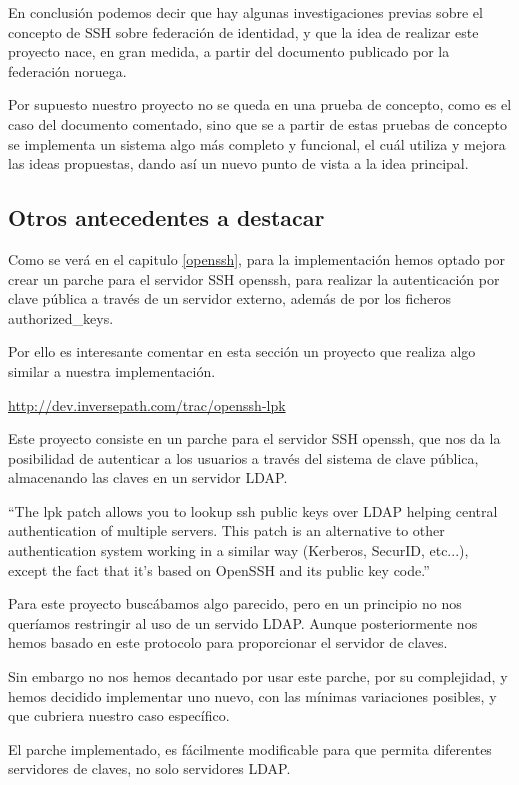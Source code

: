     En conclusión podemos decir que hay algunas investigaciones
    previas sobre el concepto de SSH sobre federación de identidad, y
    que la idea de realizar este proyecto nace, en gran medida, a
    partir del documento publicado por la federación noruega.
    
    Por supuesto nuestro proyecto no se queda en una prueba de
    concepto, como es el caso del documento comentado, sino que se a
    partir de estas pruebas de concepto se implementa un sistema algo
    más completo y funcional, el cuál utiliza y mejora las ideas
    propuestas, dando así un nuevo punto de vista a la idea principal.

    
    \subsection{Otros antecedentes a destacar}
    
        Como se verá en el capitulo \ref{openssh}, para la
        implementación hemos optado por crear un parche para el
        servidor SSH openssh, para realizar la autenticación por clave
        pública a través de un servidor externo, además de por los
        ficheros authorized\_keys.

        Por ello es interesante comentar en esta sección un proyecto
        que realiza algo similar a nuestra implementación.

        \href{http://dev.inversepath.com/trac/openssh-lpk}{http://dev.inversepath.com/trac/openssh-lpk}

        Este proyecto consiste en un parche para el servidor SSH
        openssh, que nos da la posibilidad de autenticar a los
        usuarios a través del sistema de clave pública, almacenando
        las claves en un servidor LDAP.

        ``The lpk patch allows you to lookup ssh public keys over LDAP
        helping central authentication of multiple servers. This patch
        is an alternative to other authentication system working in a
        similar way (Kerberos, SecurID, etc...), except the fact that
        it's based on OpenSSH and its public key code.''
        
        Para este proyecto buscábamos algo parecido, pero en un
        principio no nos queríamos restringir al uso de un servido
        LDAP. Aunque posteriormente nos hemos basado en este protocolo
        para proporcionar el servidor de claves.

        Sin embargo no nos hemos decantado por usar este parche, por
        su complejidad, y hemos decidido implementar uno nuevo, con
        las mínimas variaciones posibles, y que cubriera nuestro caso
        específico.

        El parche implementado, es fácilmente modificable para que
        permita diferentes servidores de claves, no solo servidores
        LDAP.

